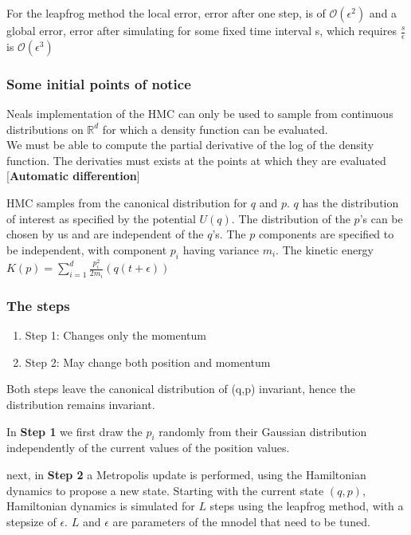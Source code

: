 \documentclass[]{report}
\begin{document}
For the leapfrog method the local error, error after one step, is of $\mathcal{O}(\epsilon^{2})$ and a global error, error after simulating for some fixed time interval s, which requires $\frac{s}{\epsilon}$ is $\mathcal{O}(\epsilon^{3})$
\subsubsection{Some initial points of notice}
Neals implementation of the HMC can only be used to sample from continuous distributions on $\mathbb{R}^{d}$ for which a density function can be evaluated.\\
We must be able to compute the partial derivative of the log of the density function. The derivaties must exists at the points at which they are evaluated [\textbf{Automatic differention}]

HMC samples from the canonical distribution for $q$ and $p$. $q$ has the distribution of interest as specified by the potential $U(q)$. 
The distribution of the $p$'s can be chosen by us and are independent of the $q$'s. 
The $p$ components are specified to be independent, with component $p_{i}$ having variance $m_{i}$.
The kinetic energy $K(p) = \sum_{i =1}^{d}\frac{p_{i}^{2}}{2m_{i}}(q(t + \epsilon))
$

\subsubsection{The steps}

\begin{enumerate}
	\item Step 1: Changes only the momentum
	\item Step 2: May change both position and momentum
\end{enumerate}
Both steps leave the canonical distribution of (q,p) invariant, hence the distribution remains invariant.

In \textbf{Step 1} we first draw the $p_{i}$ randomly from their Gaussian distribution independently of the current values of the position values. 

next, in \textbf{Step 2} a Metropolis update is performed, using the Hamiltonian dynamics to propose a new state. Starting with the current state $(q,p)$, Hamiltonian dynamics is simulated for $L$ steps using the leapfrog method, with a stepsize of $\epsilon$. $L$ and $\epsilon$ are parameters of the mnodel that need to be tuned. 
\end{document}
